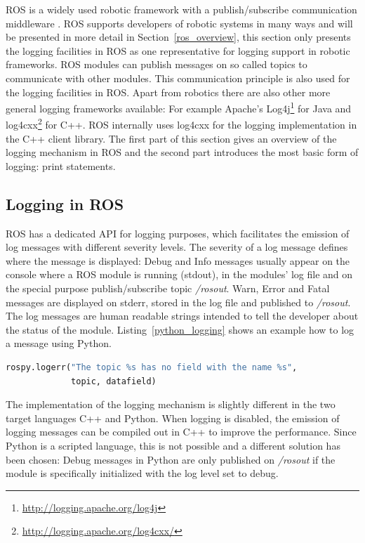 ROS is a widely used robotic framework \cite{Foote2012} with a publish/subscribe communication middleware \cite{Quigley2009}. ROS supports developers of robotic systems in many ways and will be presented in more detail in Section~\ref{ros_overview}, this section only presents the logging facilities in ROS as one representative for logging support in robotic frameworks. ROS modules can publish messages on so called topics to communicate with other modules. This communication principle is also used for the logging facilities in ROS. Apart from robotics there are also other more general logging frameworks available: For example Apache's Log4j\footnote{\url{http://logging.apache.org/log4j}} for Java and log4cxx\footnote{\url{http://logging.apache.org/log4cxx/}} for C++. ROS internally uses log4cxx for the logging implementation in the C++ client library. The first part of this section gives an overview of the logging mechanism in ROS and the second part introduces the most basic form of logging: print statements.

\subsection{Logging in ROS}
\label{ros_logging}

ROS has a dedicated API for logging purposes, which facilitates the emission of log messages with different severity levels. The severity of a log message defines where the message is displayed: Debug and Info messages usually appear on the console where a ROS module is running (stdout), in the modules' log file and on the special purpose publish/subscribe topic \emph{/rosout}. Warn, Error and Fatal messages are displayed on stderr, stored in the log file and published to \emph{/rosout}. The log messages are human readable strings intended to tell the developer about the status of the module. Listing~\ref{python_logging} shows an example how to log a message using Python.

\begin{lstlisting}[frame=single,caption={ROS logging example in Python.},label=python_logging,language=Python]
rospy.logerr("The topic %s has no field with the name %s",
             topic, datafield)
\end{lstlisting}

The implementation of the logging mechanism is slightly different in the two target languages C++ and Python. When logging is disabled, the emission of logging messages can be compiled out in C++ to improve the performance. Since Python is a scripted language, this is not possible and a different solution has been chosen: Debug messages in Python are only published on \emph{/rosout} if the module is specifically initialized with the log level set to debug.

